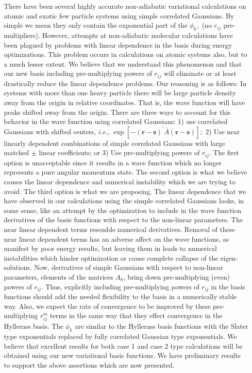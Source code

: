 \documentclass[12pt,thmsa]{article}
\begin{document}
There have been several highly accurate non-adiabatic variational
calculations on atomic and exotic few particle systems using simple
correlated Gaussians\cite
{Kinghorn93,Kinghorn95b,Kozlowski93b,Kinghorn96a,Varga96}. By simple we mean
they only contain the exponential part of the $\phi _k,$ (no $r_{ij}$
pre-multipliers). However, attempts at non-adiabatic molecular calculations
have been plagued by problems with linear dependence in the basis during
energy optimizations. This problem occurs in calculations on atomic systems
also, but to a much lesser extent. We believe that we understand this
phenomenon and that our new basis including pre-multiplying powers of $r_{ij}
$ will eliminate or at least drastically reduce the linear dependence
problems. Our reasoning is as follows: In systems with more than one heavy
particle there will be large particle density away from the origin in
relative coordinates. That is, the wave function will have peaks shifted
away from the origin. There are three ways to account for this behavior in
the wave function using correlated Gaussians: 1) use correlated Gaussians
with shifted centers, \textit{i.e.}, $\exp [-\left( \mathbf{r-s}\right)
^{\prime }\bar{A}\left( \mathbf{r-s}\right) ];$ 2) Use near linearly
dependent combinations of simple correlated Gaussians with large matched $%
\pm $ linear coefficients; or 3) Use pre-multiplying powers of $r_{ij}$. The
first option is unacceptable since it results in a wave function which no
longer represents a pure angular momentum state. The second option is what
we believe causes the linear dependence and numerical instability which we
are trying to avoid. The third option is what we are proposing. The linear
dependence that we have observed in our calculations using the simple
correlated Gaussians looks, in some sense, like an attempt by the
optimization to include in the wave function derivatives of the basis
functions with respect to the non-linear parameters. The near linear
dependent terms resemble numerical derivatives. Removal of these near linear
dependent terms has an adverse affect on the wave functions, as manifest by
poor energy results, but leaving them in leads to numerical instabilities
which hinder optimization or cause complete collapse of the eigen-solutions.
Now, derivatives of simple Gaussians with respect to non-linear parameters,
elements of the matrices $A_k$, bring down pre-multiplying (even) powers of $%
r_{ij}$. Thus, explicitly including pre-multiplying powers of $r_{ij}$ in
the basis functions should add the needed flexibility to the basis in a
numerically stable way. Also, we expect the rate of convergence to be
improved by these pre-multiplying $r_{ij}^m$ terms in the same way that they
effect convergence in the Hyllerass basis. The $\phi _k$ are similar to the
Hyllerass basis functions with the Slater type exponentials replaced by
fully correlated Gaussian type exponentials. We believe that excellent
results for both case 1 and case 2 type calculations will be obtained using
our new variational basis functions. We have preliminary results to support
the above assertions which are now presented.
\end{document}

